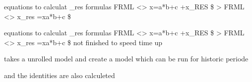 \documentclass[letterpaper,10pt,english]{sphinxmanual}
\begin{document}

\begin{fulllineitems}
\label{\detokenize{index:modelmanipulation.find_res_dynare}}
\pysigstartsignatures
{}
\pysigstopsignatures
\sphinxAtStartPar
equations to calculat \_res formulas
FRML \textless{}\textgreater{} x=a*b+c +x\_RES  \$ \sphinxhyphen{}\textgreater{} FRML \textless{}\textgreater{} x\_res =x\sphinxhyphen{}a*b+c  \$

\end{fulllineitems}


\begin{fulllineitems}
\label{\detokenize{index:modelmanipulation.find_res_dynare_new}}
\pysigstartsignatures
{}
\pysigstopsignatures
\sphinxAtStartPar
equations to calculat \_res formulas
FRML \textless{}\textgreater{} x=a*b+c +x\_RES  \$ \sphinxhyphen{}\textgreater{} FRML \textless{}\textgreater{} x\_res =x\sphinxhyphen{}a*b+c  \$
not finished to speed time up

\end{fulllineitems}


\begin{fulllineitems}
\label{\detokenize{index:modelmanipulation.find_hist_model}}
\pysigstartsignatures
{}
\pysigstopsignatures
\sphinxAtStartPar
takes a unrolled model and create a model which can be run for historic periode

\sphinxAtStartPar
and the identities are also calculeted

\end{fulllineitems}

\end{document}
